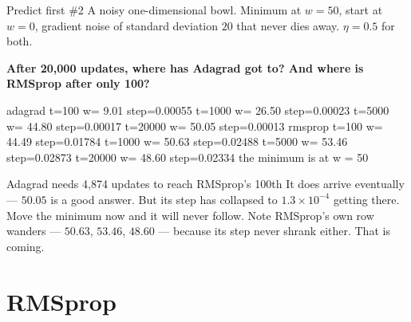 \documentclass[aspectratio=169]{beamer}
\begin{document}
\begin{frame}[fragile,shrink=6]{Predict first \#2}
A noisy one-dimensional bowl. Minimum at $w = 50$, start at $w = 0$, gradient
noise of standard deviation $20$ that never dies away. $\eta = 0.5$ for both.

\begin{center}
  \textbf{After 20{,}000 updates, where has Adagrad got to?
  And where is RMSprop after only 100?}
\end{center}
\vspace{0.3em}
\begin{outblk}
adagrad  t=100   w=  9.01 step=0.00055  t=1000  w= 26.50 step=0.00023
         t=5000  w= 44.80 step=0.00017  t=20000 w= 50.05 step=0.00013
rmsprop  t=100   w= 44.49 step=0.01784  t=1000  w= 50.63 step=0.02488
         t=5000  w= 53.46 step=0.02873  t=20000 w= 48.60 step=0.02334
the minimum is at w = 50
\end{outblk}
\begin{alertblock}{Adagrad needs 4{,}874 updates to reach RMSprop's 100th}
  \footnotesize It does arrive eventually --- $50.05$ is a good answer. But its
  step has collapsed to $1.3\times10^{-4}$ getting there. Move the minimum now
  and it will never follow. Note RMSprop's own row wanders --- $50.63$, $53.46$,
  $48.60$ --- because its step never shrank either. That is coming.
\end{alertblock}
\end{frame}

\section{RMSprop}
\label{sec:rmsprop}
\end{document}
